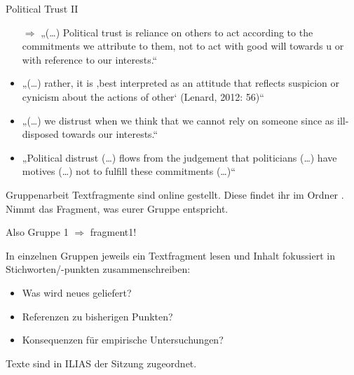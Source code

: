 \documentclass[11pt]{beamer}
\begin{document}
\begin{frame}[t]{Political Trust II} 
\begin{itemize}
	\item[$\Rightarrow$]„(…) Political trust is reliance on others to act according to the commitments we attribute to them, not to act with good will towards u or with reference to our interests.“ \parencite[455]{Festenstein2019} \pause
	\item „(…) rather, it is ‚best interpreted as an attitude that reflects suspicion or cynicism about the actions of other‘ (Lenard, 2012: 56)“ \parencite[457]{Festenstein2019} \pause
	\item „(…) we distrust when we think that we cannot rely on someone since as ill-disposed towards our interests.“ \parencite[457]{Festenstein2019} \pause
	\item „Political distrust (…) flows from the judgement that politicians (…) have motives (…) not to fulfill these commitments (…)“ \parencite[457]{Festenstein2019}

\end{itemize}

\end{frame}

\begin{frame}[t]{Gruppenarbeit}
Textfragmente sind online gestellt. Diese findet ihr im Ordner . Nimmt das Fragment, was eurer Gruppe entspricht. 

Also Gruppe 1 $\Rightarrow$ fragment1!

In einzelnen Gruppen jeweils ein Textfragment lesen und Inhalt fokussiert in Stichworten/-punkten zusammenschreiben:

\begin{itemize}
	\item Was wird neues geliefert?
	\item Referenzen zu bisherigen Punkten?
	\item Konsequenzen für empirische Untersuchungen?
\end{itemize}

Texte sind in ILIAS der Sitzung zugeordnet.

\end{frame}
\end{document}

